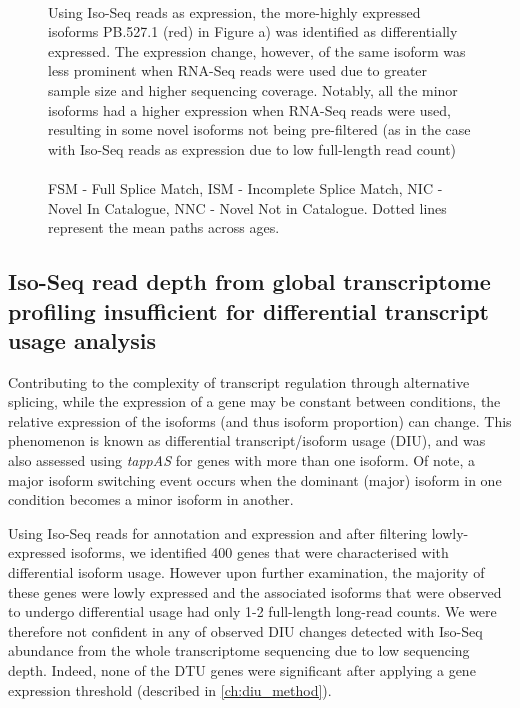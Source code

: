 \begin{figure}[!htp]
{	\\	
	Using Iso-Seq reads as expression, the more-highly expressed isoforms PB.527.1 (red) in Figure a) was identified as differentially expressed. The expression change, however, of the same isoform was less prominent when RNA-Seq reads were used due to greater sample size and higher sequencing coverage. Notably, all the minor isoforms had a higher expression when RNA-Seq reads were used, resulting in some novel isoforms not being pre-filtered (as in the case with Iso-Seq reads as expression due to low full-length read count)
	\\
	\\
	FSM - Full Splice Match, ISM - Incomplete Splice Match, NIC - Novel In Catalogue, NNC - Novel Not in Catalogue. Dotted lines represent the mean paths across ages.
}   
	\label{fig:dei_highisoexp}
\end{figure}


\clearpage
\subsection{Iso-Seq read depth from global transcriptome profiling insufficient for differential transcript usage analysis}
Contributing to the complexity of transcript regulation through alternative splicing, while the expression of a gene may be constant between conditions, the relative expression of the isoforms (and thus isoform proportion) can change. This phenomenon is known as differential transcript/isoform usage (DIU), and was also assessed using \textit{tappAS} for genes with more than one isoform. Of note, a major isoform switching event occurs when the dominant (major) isoform in one condition becomes a minor isoform in another.    

Using Iso-Seq reads for annotation and expression and after filtering lowly-expressed isoforms, we identified 400 genes that were characterised with differential isoform usage. However upon further examination, the majority of these genes were lowly expressed and the associated isoforms that were observed to undergo differential usage had only 1-2 full-length long-read counts. We were therefore not confident in any of observed DIU changes detected with Iso-Seq abundance from the whole transcriptome sequencing due to low sequencing depth. Indeed, none of the DTU genes were significant after applying a gene expression threshold (described in \cref{ch:diu_method}).


